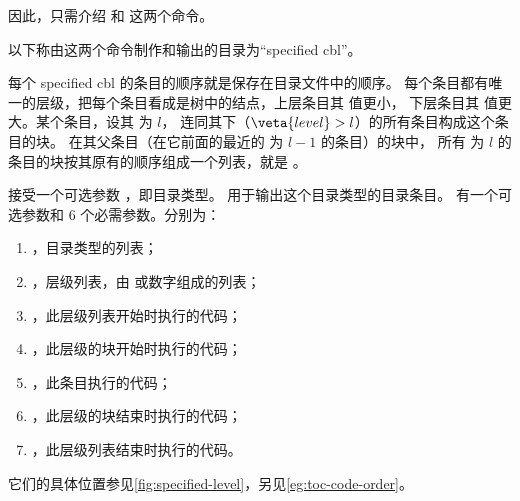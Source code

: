 \documentclass{cusdoc}
\begin{document}
因此，只需介绍  和 
 这两个命令。

以下称由这两个命令制作和输出的目录为“specified cbl”。

每个 specified cbl 的条目的顺序就是保存在目录文件中的顺序。
每个条目都有唯一的层级，把每个条目看成是树中的结点，上层条目其  值更小，
下层条目其  值更大。某个条目，设其  为 $l$，
连同其下（$\veta{level}>l$）的所有条目构成这个条目的块。
在其父条目（在它前面的最近的  为 $l-1$ 的条目）的块中，
所有  为 $l$ 的条目的块按其原有的顺序组成一个列表，就是 。

 接受一个可选参数 ，即目录类型。
用于输出这个目录类型的目录条目。
 有一个可选参数和 6 个必需参数。分别为：
\begin{enumerate}
  \item {}，目录类型的列表；
  \item {}，层级列表，由  或数字组成的列表；
  \item {}，此层级列表开始时执行的代码；
  \item {}，此层级的块开始时执行的代码；
  \item {}，此条目执行的代码；
  \item {}，此层级的块结束时执行的代码；
  \item {}，此层级列表结束时执行的代码。
\end{enumerate}
它们的具体位置参见\cref{fig:specified-level}，另见\cref{eg:toc-code-order}。
\end{document}
